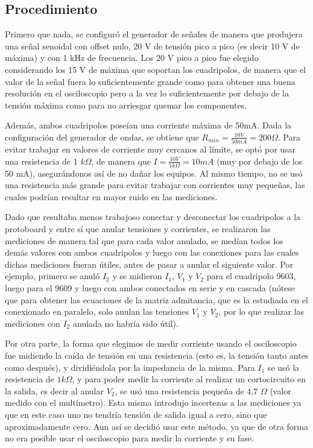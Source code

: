     \graphicspath{{imagenesFiguras/}} %

    \subsection{Procedimiento}
    
    Primero que nada, se configuró el generador de señales de manera que produjera una señal senoidal con offset nulo, 20 V de tensión
    pico a pico (es decir 10 V de máxima) y con 1 kHz de frecuencia. Los 20 V pico a pico fue elegido considerando los 15 V de máxima
    que soportan los cuadripolos, de manera que el valor de la señal fuera lo suficientemente grande como para obtener una buena 
    resolución en el osciloscopio pero a la vez lo suficientemente por debajo de la tensión máxima como para no arriesgar quemar los
    componentes. 
    
    
    Además, ambos cuadripolos poseían una corriente máxima de 50mA. Dada la configuración del generador de ondas, se obtiene que  
    $R_{min} = \frac{10 V}{50 mA} = 200 \Omega$. Para evitar trabajar en valores de corriente muy cercanos al límite, se optó por
    usar una resistencia de 1 $k\Omega$, de manera que $ I = \frac{10 V}{1 k\Omega} = 10 mA $ (muy por debajo de los 50 mA), 
    asegurándonos así de no dañar los equipos. Al mismo tiempo, no se usó una resistencia más grande para evitar trabajar con
    corrientes muy pequeñas, las cuales podrían resultar en mayor ruido en las mediciones. 

    \par Dado que resultaba menos trabajoso conectar y desconectar los cuadripolos a la protoboard y entre sí que anular tensiones y
    corrientes, se realizaron las mediciones de manera tal que para cada valor anulado, se medían todos los demás valores con ambos
    cuadripolos y luego con las conexiones para las cuales dichas mediciones fueran útiles, antes de pasar a anular el siguiente valor.
    Por ejemplo, primero se anuló $ I_2 $ y se midieron $ I_1 $, $ V_1 $ y $ V_2 $ para el cuadripolo 9603, luego 
    para el 9609 y luego con ambos conectados en serie y en cascada (nótese que para obtener las ecuaciones de la matriz admitancia, 
    que es la estudiada en el conexionado en paralelo, solo anulan las tensiones $ V_1 $ y $ V_2 $, por lo que realizar las mediciones
    con $ I_2 $ anulada no habría sido útil).

    \par Por otra parte, la forma que elegimos de medir corriente usando el osciloscopio fue midiendo la caída de tensión en una 
    resistencia (esto es, la tensión tanto antes como después), y dividiéndola por la impedancia de la misma. Para $ I_1 $ se usó la
    resistencia de $ 1 k\Omega $, y para poder medir la corriente al realizar un cortocircuito en la salida, es decir al anular $ V_2 $,
    se usó una resistencia pequeña de 4,7 $\Omega$ (valor medido con el multímetro). Esta misma introdujo incertezas a las mediciones
    ya que en este caso uno no tendría tensión de salida igual a cero, sino que aproximadamente cero. Aun así se decidió usar este
    método, ya que de otra forma no era posible usar el osciloscopio para medir la corriente y su fase.


